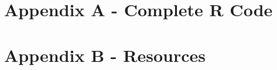 \documentclass[12pt]{article}
\begin{document}












\newpage
\appendix
\section{Appendix A - Complete R Code} \label{sec:appendix_a}



\section{Appendix B - Resources} \label{sec:appendix_b}


\end{document}
